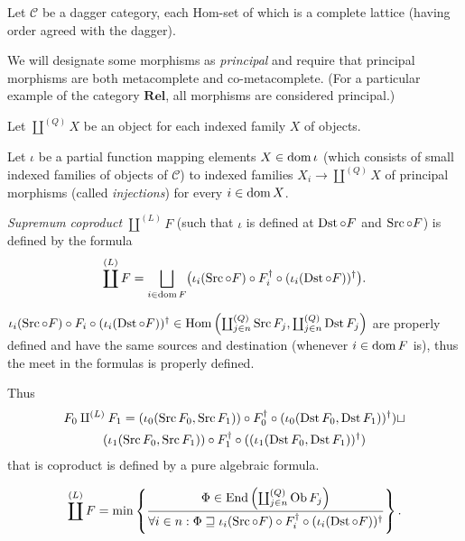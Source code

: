 Let $\mathcal{C}$ be a dagger category, each Hom-set of which is a complete
lattice (having order agreed with the dagger).

We will designate some morphisms as \emph{principal} and require that
principal morphisms are both metacomplete and co-metacomplete. (For a
particular example of the category $\mathbf{Rel}$, all morphisms are
considered principal.)

Let $\coprod^{(Q)} X$ be an object for each indexed family $X$ of objects.

Let $\iota$ be a partial function mapping elements $X \in \operatorname{dom} \iota$
(which consists of small indexed families of objects of $\mathcal{C}$) to
indexed families $X_i \rightarrow \coprod^{(Q)} X$ of principal morphisms
(called \emph{injections}) for every $i \in \operatorname{dom} X$.

\begin{defn}
  \emph{Supremum coproduct} $\coprod^{(L)} F$ (such that $\iota$ is defined
  at $\operatorname{Dst}\circ F$ and $\operatorname{Src}\circ F$) is defined by the formula
  \[ \coprod^{(L)} F = \bigsqcup_{i \in \dom F} \bigl(\iota_i(\Src\circ F) \circ F_i^{\dagger} \circ (\iota_i(\Dst\circ F))^{\dagger}\bigr) . \]
\end{defn}

\begin{rem}
  $\iota_i(\operatorname{Src}\circ F) \circ F_i \circ (\iota_i(\operatorname{Dst}\circ F))^{\dagger} \in \operatorname{Hom} \left(
  \coprod^{(Q)}_{j \in n} \operatorname{Src} F_j , \coprod^{(Q)}_{j \in n} \operatorname{Dst}
  F_j \right)$ are properly defined and have the same sources and destination
  (whenever $i \in \operatorname{dom} F$ is), thus the meet in the formulas is
  properly defined.
\end{rem}

\begin{rem}
  Thus
  \begin{multline*}
    F_0 \amalg^{(L)} F_1 = (\iota_0(\operatorname{Src} F_0 , \operatorname{Src} F_1)) \circ
    F_0^{\dagger} \circ (\iota_0(\operatorname{Dst} F_0 , \operatorname{Dst}
    F_1))^{\dagger}) \sqcup\\ (\iota_1(\operatorname{Src} F_0 , \operatorname{Src} F_1))
    \circ F_1^{\dagger} \circ ((\iota_1(\operatorname{Dst} F_0 , \operatorname{Dst}
    F_1))^{\dagger})
  \end{multline*}
  that is coproduct is defined by a pure algebraic formula.
\end{rem}

\begin{prop}
  \[ \coprod^{(L)} F = \min \left\{ \frac{ \Phi \in \operatorname{End} \left( \coprod^{(Q)}_{j
  \in n} \operatorname{Ob} F_j \right) }{ \forall i \in n :
  \Phi \sqsupseteq \iota_i(\operatorname{Src}\circ F) \circ
  F_i^{\dagger} \circ (\iota_i(\operatorname{Dst}\circ F))^{\dagger} }\right\}. \]
\end{prop}

